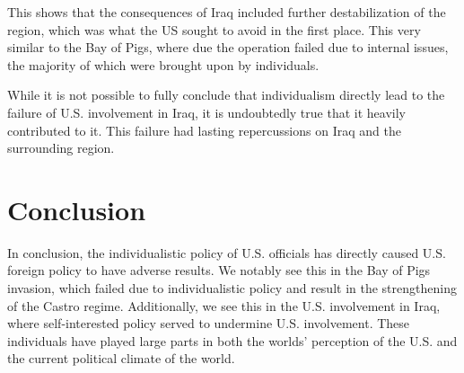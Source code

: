 \documentclass[12pt]{article}
\begin{document}
        This shows that the consequences of Iraq included further destabilization of the region, which was what the US sought to avoid in the first place. This very similar to the Bay of Pigs, where due the operation failed due to internal issues, the majority of which were brought upon by individuals.  

        While it is not possible to fully conclude that individualism directly lead to the failure of U.S. involvement in Iraq, it is undoubtedly true that it heavily contributed to it. This failure had lasting repercussions on Iraq and the surrounding region.
        
\section{Conclusion}
        In conclusion, the individualistic policy of U.S. officials has directly caused U.S. foreign policy to have adverse results. We notably see this in the Bay of Pigs invasion, which failed due to individualistic policy and result in the strengthening of the Castro regime. Additionally, we see this in the U.S. involvement in Iraq, where self-interested policy served to undermine U.S. involvement. These individuals have played large parts in both the worlds' perception of the U.S. and the current political climate of the world.


\pagebreak

\printbibliography[heading=bibintoc]
\end{document}
